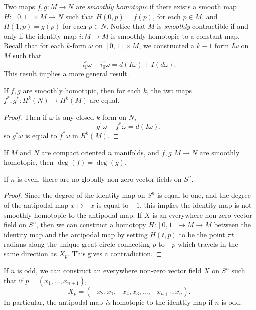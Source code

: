 Two maps $f,g: M \to N$ are \emph{smoothly homotopic} if there exists a smooth map $H: [0,1] \times M \to N$ such that $H(0,p) = f(p)$, for each $p \in M$, and $H(1,p) = g(p)$ for each $p \in N$. Notice that $M$ is \emph{smoothly} contractible if and only if the identity map $i: M \to M$ is smoothly homotopic to a constant map. Recall that for each $k$-form $\omega$ on $[0,1] \times M$, we constructed a $k-1$ form $I\omega$ on $M$ such that
%
\[ i_1^* \omega - i_0^* \omega = d(I\omega) + I(d\omega). \]
%
This result implies a more general result.

\begin{theorem}
    If $f,g$ are smoothly homotopic, then for each $k$, the two maps $f^*, g^*: H^k(N) \to H^k(M)$ are equal.
\end{theorem}
\begin{proof}
    Then if $\omega$ is any closed $k$-form on $N$,
    \[ g^* \omega - f^* \omega = d(I \omega), \]
    so $g^* \omega$ is equal to $f^* \omega$ in $H^k(M)$.
\end{proof}

\begin{corollary}
    If $M$ and $N$ are compact oriented $n$ manifolds, and $f,g: M \to N$ are smoothly homotopic, then $\deg(f) = \deg(g)$.
\end{corollary}

\begin{corollary}
    If $n$ is even, there are no globally non-zero vector fields on $S^n$.
\end{corollary}
\begin{proof}
    Since the degree of the identity map on $S^n$ is equal to one, and the degree of the antipodal map $x \mapsto -x$ is equal to $-1$, this implies the identity map is not smoothly homotopic to the antipodal map. If $X$ is an everywhere non-zero vector field on $S^n$, then we can construct a homotopy $H: [0,1] \to M \to M$ between the identity map and the antipodal map by setting $H(t,p)$ to be the point $\pi t$ radians along the unique great circle connecting $p$ to $-p$ which travels in the same direction as $X_p$. This gives a contradiction.
\end{proof}

\begin{remark}
    If $n$ is odd, we can construct an everywhere non-zero vector field $X$ on $S^n$ such that if $p = (x_1, \dots, x_{n+1})$,
    \[ X_p = (-x_2,x_1,-x_4,x_3, \dots, -x_{n+1},x_n). \]
    In particular, the antipodal map \emph{is} homotopic to the identtiy map if $n$ is odd.
\end{remark}

